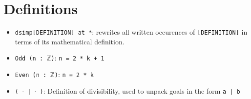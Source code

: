 \documentclass{exam}
\newcommand{\ZZ}{\mathbb Z}
\begin{document}
    \section*{Definitions}
    \begin{itemize}
        \item \verb|dsimp[DEFINITION] at *|: rewrites all written occurences of \texttt{[DEFINITION]} in terms of its mathematical definition.
        \item \texttt{Odd (n : $\ZZ$)}: \texttt{n = 2 * k + 1}
        \item \texttt{Even (n : $\ZZ$)}: \texttt{n = 2 * k}
        \item \texttt{( $\cdot$ | $\cdot$ )}: Definition of divisibility, used to unpack goals in the form \texttt{a | b}
    \end{itemize}
\end{document}
